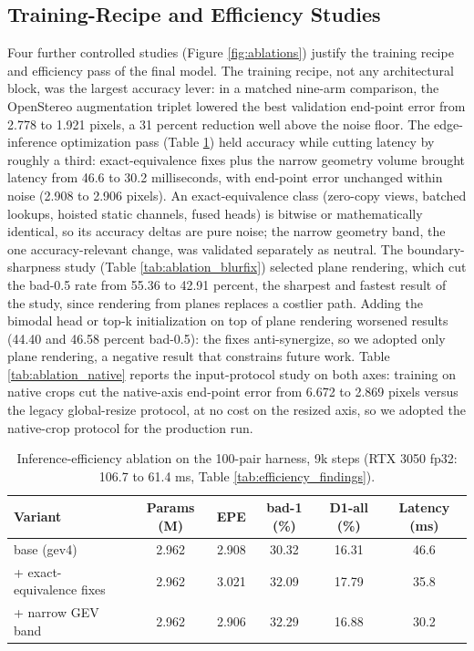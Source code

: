 \FloatBarrier
\subsection{Training-Recipe and Efficiency Studies}
Four further controlled studies (Figure \ref{fig:ablations}) justify
the training recipe and efficiency pass of the final model. The
training recipe, not any architectural block, was the largest accuracy
lever: in a matched nine-arm comparison, the OpenStereo augmentation
triplet lowered the best validation end-point error from 2.778 to
1.921 pixels, a 31 percent reduction well above the noise floor. The
edge-inference optimization pass (Table \ref{tab:ablation_efficiency})
held accuracy while cutting latency by roughly a third:
exact-equivalence fixes plus the narrow geometry volume brought
latency from 46.6 to 30.2 milliseconds, with end-point error unchanged
within noise (2.908 to 2.906 pixels). An exact-equivalence class
(zero-copy views, batched lookups, hoisted static channels, fused
heads) is bitwise or mathematically identical, so its accuracy deltas
are pure noise; the narrow geometry band, the one accuracy-relevant
change, was validated separately as neutral. The boundary-sharpness
study (Table \ref{tab:ablation_blurfix}) selected plane rendering,
which cut the bad-0.5 rate from 55.36 to 42.91 percent, the sharpest
and fastest result of the study, since rendering from planes replaces
a costlier path. Adding the bimodal head or top-k initialization on top
of plane rendering worsened results (44.40 and 46.58 percent bad-0.5):
the fixes anti-synergize, so we adopted only plane rendering, a
negative result that constrains future work. Table
\ref{tab:ablation_native} reports the input-protocol study on both
axes: training on native crops cut the native-axis end-point error
from 6.672 to 2.869 pixels versus the legacy global-resize protocol,
at no cost on the resized axis, so we adopted the native-crop protocol
for the production run.

\begin{table}[!htbp]
\centering
\caption{Inference-efficiency ablation on the 100-pair harness, 9k steps (RTX 3050 fp32: 106.7 to 61.4 ms, Table \ref{tab:efficiency_findings}).}
\label{tab:ablation_efficiency}
\small
\begin{tabular}{lccccc}
\toprule
Variant & Params (M) & EPE & bad-1 (\%) & D1-all (\%) & Latency (ms)\\
\midrule
base (gev4) & 2.962 & 2.908 & 30.32 & 16.31 & 46.6\\
+ exact-equivalence fixes & 2.962 & 3.021 & 32.09 & 17.79 & 35.8\\
+ narrow GEV band & 2.962 & 2.906 & 32.29 & 16.88 & 30.2\\
\bottomrule
\end{tabular}
\end{table}

